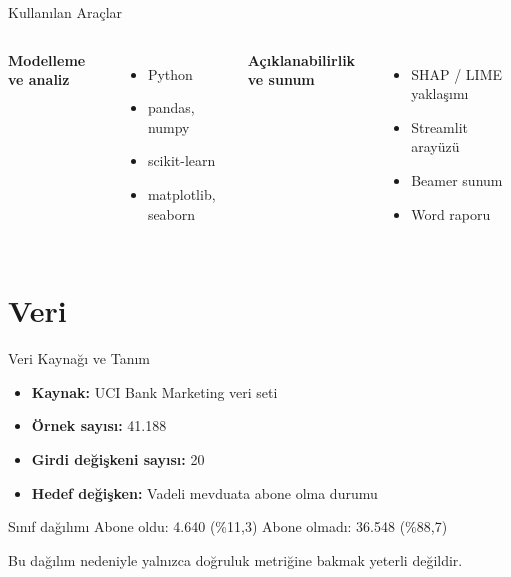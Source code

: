 \documentclass[aspectratio=169]{beamer}
\begin{document}
\begin{frame}{Kullanılan Araçlar}
    \begin{columns}[T]
        \textbf{Modelleme ve analiz}
        \begin{itemize}
            \item Python
            \item pandas, numpy
            \item scikit-learn
            \item matplotlib, seaborn
        \end{itemize}

        \textbf{Açıklanabilirlik ve sunum}
        \begin{itemize}
            \item SHAP / LIME yaklaşımı
            \item Streamlit arayüzü
            \item Beamer sunum
            \item Word raporu
        \end{itemize}
    \end{columns}
\end{frame}

\section{Veri}

\begin{frame}{Veri Kaynağı ve Tanım}
    \begin{itemize}
        \item \textbf{Kaynak:} UCI Bank Marketing veri seti
        \item \textbf{Örnek sayısı:} 41.188
        \item \textbf{Girdi değişkeni sayısı:} 20
        \item \textbf{Hedef değişken:} Vadeli mevduata abone olma durumu
    \end{itemize}

    \begin{block}{Sınıf dağılımı}
        Abone oldu: 4.640 \quad (\%11,3) \hfill
        Abone olmadı: 36.548 \quad (\%88,7)
    \end{block}

    \small Bu dağılım nedeniyle yalnızca doğruluk metriğine bakmak yeterli değildir.
\end{frame}
\end{document}
